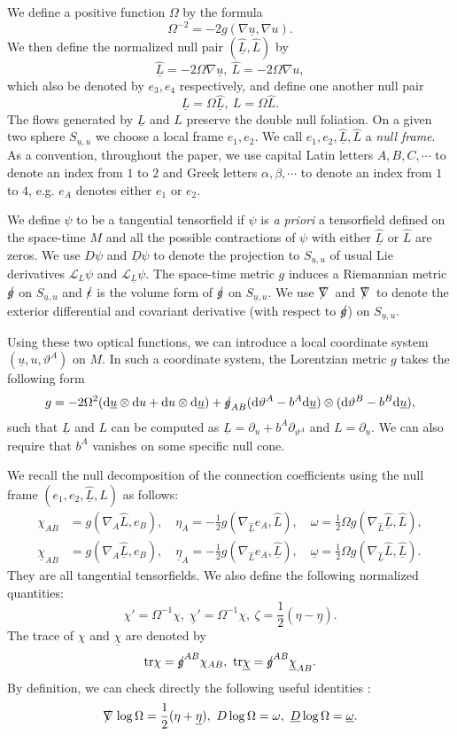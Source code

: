 \documentclass[11pt,reqno]{amsart}
\theoremstyle{definition}
\numberwithin{equation}{section}
\newcommand{\D}{\mathrm{d}}
\newcommand{\tr}{\mathrm{tr}}
\def\chib{\underline{\chi}}
\def\etab{\underline{\eta}}
\def\Lb{\underline{L}}
\def\tr{\mathrm{tr}}
\def\omegab{\underline{\omega}}
\def\ub{\underline{u}}
\def\Lh{\widehat{L}}
\def\Lbh{\widehat{\underline{L}}}
\newcommand{\Db}{\underline{D}}
\def\nablas{\mbox{$\nabla \mkern -13mu /$ }}
\def\ds{\mbox{$\nabla \mkern -13mu /$ }}
\def\gs{\mbox{$g \mkern -9mu /$}}
\def\epsilons{\mbox{$\epsilon \mkern -9mu /$}}
\begin{document}
We define a positive function $\Omega$ by the formula
$$ \Omega^{-2}=-2g(\nabla\ub,\nabla u).$$
  We then define the normalized null pair $(\Lbh, \Lh)$ by
  $$\Lbh=-2\Omega\nabla\ub,\ \Lh=-2\Omega\nabla u,$$ which also be denoted by $e_3,e_4$ respectively, and define one another null pair
  $$\Lb=\Omega \Lbh,\ L=\Omega \Lh.$$
 The flows generated by $\Lb$ and $L$ preserve the double null foliation. On a given two sphere $S_{\ub, u}$ we choose a local frame $
   {e_1,e_2}$. We call ${e_1, e_2, \Lbh, \Lh}$ a \emph{null frame}.  As a convention, throughout the paper, we use capital  Latin letters $A, B, C, \cdots$ to denote an index from $1$ to $2$ and Greek letters $\alpha,\beta,\cdots$ to denote an index from $1$ to $4$, e.g. $e_A$ denotes either $e_1$ or $e_2$.

We define $\psi$ to be a tangential tensorfield if $\psi$ is \textit{a priori} a tensorfield defined on the space-time $M$ and all the possible contractions of $\psi$ with either $\Lbh$ or $\Lh$ are zeros. We use $D\psi$ and $\Db\psi$ to denote the projection to $S_{\ub,u}$ of usual Lie derivatives $\mathcal{L}_L\psi$ and $\mathcal{L}_{\Lb}\psi$. The space-time metric $g$ induces a Riemannian metric $\gs$ on $S_{\ub,u}$ and $\epsilons$ is the volume form of $\gs$ on $S_{\ub,u}$. We use $\ds$ and $\nablas$ to denote the exterior differential and covariant derivative (with respect to $\gs$) on $S_{\ub,u}$.


Using these two optical functions, we can introduce a local coordinate system $(\ub,u,\vartheta^A)$ on $M$. In such a coordinate system, the Lorentzian metric $g$ takes the following form
\begin{align*}
g=-2\Omega^2(\D\ub\otimes\D u+\D u\otimes\D \ub)+\gs_{AB}(\D\vartheta^A-b^A\D\ub)\otimes(\D\vartheta^B-b^B\D\ub),
\end{align*}
such that $\Lb$ and $L$ can be computed as $\Lb=\partial_u+b^A\partial_{\vartheta^A}$ and $L=\partial_{\ub}$. We can also require that $b^A$ vanishes on some specific null cone.


We recall the null decomposition of the connection coefficients using the null frame $(e_1,e_2,\Lbh,\Lh)$ as follows:
\begin{align*}
\chi_{AB}&=g(\nabla_A\Lh,e_B),\quad \eta_A=-\frac{1}{2}g(\nabla_{\Lbh}e_A,\Lh),\quad \omega=\frac{1}{2}\Omega g(\nabla_{\Lh}\Lbh,\Lh),\\
\chib_{AB}&=g(\nabla_A\Lbh,e_B), \quad\etab_A=-\frac{1}{2}g(\nabla_{\Lh}e_A,\Lbh), \quad\omegab=\frac{1}{2}\Omega g(\nabla_{\Lbh}\Lh,\Lbh).
\end{align*}
They are all tangential tensorfields. We also define the following normalized quantities:
$$\chi'=\Omega^{-1}\chi,\ \chib'=\Omega^{-1}\chi,\ \zeta=\frac{1}{2}(\eta-\etab).$$
 The trace of $\chi$ and $\chib$ are denoted by
 $$\tr\chi = \gs^{AB}\chi_{AB},\ \tr\chib = \gs^{AB}\chib_{AB}.$$
  By definition, we can check directly the following useful identities :
  $$\ds\log\Omega=\frac{1}{2}(\eta+\etab),\ D\log\Omega=\omega,\ \Db\log\Omega=\omegab.$$
\end{document}
